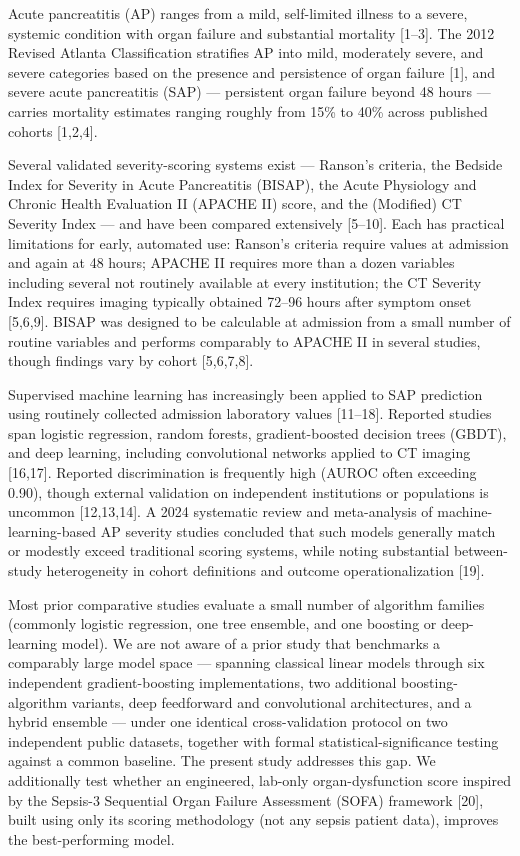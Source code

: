 \documentclass[10pt]{article} %
\begin{document}
Acute pancreatitis (AP) ranges from a mild, self-limited illness to a severe, systemic condition with organ failure and substantial mortality [1--3]. The 2012 Revised Atlanta Classification stratifies AP into mild, moderately severe, and severe categories based on the presence and persistence of organ failure [1], and severe acute pancreatitis (SAP) --- persistent organ failure beyond 48 hours --- carries mortality estimates ranging roughly from 15\% to 40\% across published cohorts [1,2,4].

Several validated severity-scoring systems exist --- Ranson's criteria, the Bedside Index for Severity in Acute Pancreatitis (BISAP), the Acute Physiology and Chronic Health Evaluation II (APACHE II) score, and the (Modified) CT Severity Index --- and have been compared extensively [5--10]. Each has practical limitations for early, automated use: Ranson's criteria require values at admission and again at 48 hours; APACHE II requires more than a dozen variables including several not routinely available at every institution; the CT Severity Index requires imaging typically obtained 72--96 hours after symptom onset [5,6,9]. BISAP was designed to be calculable at admission from a small number of routine variables and performs comparably to APACHE II in several studies, though findings vary by cohort [5,6,7,8].

Supervised machine learning has increasingly been applied to SAP prediction using routinely collected admission laboratory values [11--18]. Reported studies span logistic regression, random forests, gradient-boosted decision trees (GBDT), and deep learning, including convolutional networks applied to CT imaging [16,17]. Reported discrimination is frequently high (AUROC often exceeding 0.90), though external validation on independent institutions or populations is uncommon [12,13,14]. A 2024 systematic review and meta-analysis of machine-learning-based AP severity studies concluded that such models generally match or modestly exceed traditional scoring systems, while noting substantial between-study heterogeneity in cohort definitions and outcome operationalization [19].

Most prior comparative studies evaluate a small number of algorithm families (commonly logistic regression, one tree ensemble, and one boosting or deep-learning model). We are not aware of a prior study that benchmarks a comparably large model space --- spanning classical linear models through six independent gradient-boosting implementations, two additional boosting-algorithm variants, deep feedforward and convolutional architectures, and a hybrid ensemble --- under one identical cross-validation protocol on two independent public datasets, together with formal statistical-significance testing against a common baseline. The present study addresses this gap. We additionally test whether an engineered, lab-only organ-dysfunction score inspired by the Sepsis-3 Sequential Organ Failure Assessment (SOFA) framework [20], built using only its scoring methodology (not any sepsis patient data), improves the best-performing model.
\end{document}
